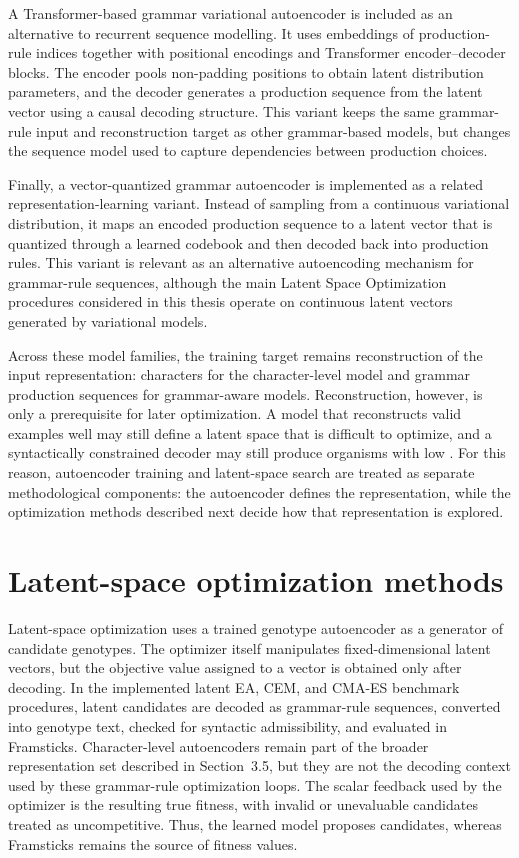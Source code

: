 A Transformer-based grammar variational autoencoder is included as an alternative to recurrent sequence modelling. It uses embeddings of production-rule indices together with positional encodings and Transformer encoder--decoder blocks. The encoder pools non-padding positions to obtain latent distribution parameters, and the decoder generates a production sequence from the latent vector using a causal decoding structure. This variant keeps the same grammar-rule input and reconstruction target as other grammar-based models, but changes the sequence model used to capture dependencies between production choices.

Finally, a vector-quantized grammar autoencoder is implemented as a related representation-learning variant. Instead of sampling from a continuous variational distribution, it maps an encoded production sequence to a latent vector that is quantized through a learned codebook and then decoded back into production rules. This variant is relevant as an alternative autoencoding mechanism for grammar-rule sequences, although the main Latent Space Optimization procedures considered in this thesis operate on continuous latent vectors generated by variational models.

Across these model families, the training target remains reconstruction of the input representation: characters for the character-level model and grammar production sequences for grammar-aware models. Reconstruction, however, is only a prerequisite for later optimization. A model that reconstructs valid examples well may still define a latent space that is difficult to optimize, and a syntactically constrained decoder may still produce organisms with low \vertpos{}. For this reason, autoencoder training and latent-space search are treated as separate methodological components: the autoencoder defines the representation, while the optimization methods described next decide how that representation is explored.

\section{Latent-space optimization methods}

Latent-space optimization uses a trained genotype autoencoder as a generator of candidate \fone{} genotypes. The optimizer itself manipulates fixed-dimensional latent vectors, but the objective value assigned to a vector is obtained only after decoding. In the implemented latent EA, CEM, and CMA-ES benchmark procedures, latent candidates are decoded as grammar-rule sequences, converted into genotype text, checked for syntactic admissibility, and evaluated in Framsticks. Character-level autoencoders remain part of the broader representation set described in Section~3.5, but they are not the decoding context used by these grammar-rule optimization loops. The scalar feedback used by the optimizer is the resulting true \vertpos{} fitness, with invalid or unevaluable candidates treated as uncompetitive. Thus, the learned model proposes candidates, whereas Framsticks remains the source of fitness values.

